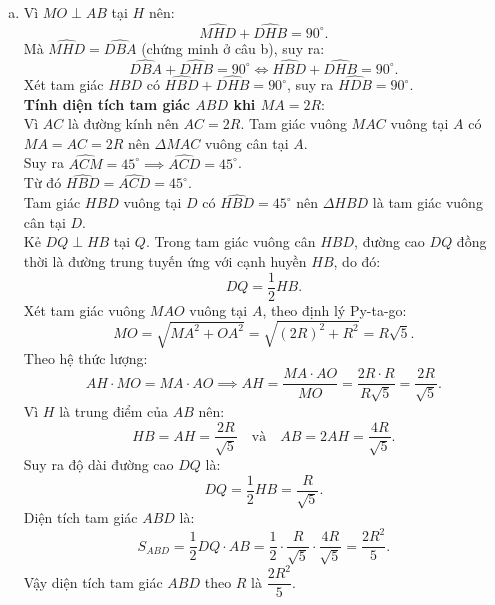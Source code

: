 \begin{bt}
{\begin{enumerate}[a)]
		Suy ra $\Delta MHD \backsim \Delta MCO$ (c-g-c), do đó:
		$$\widehat{MHD} = \widehat{MCO} = \widehat{ACD}.$$
		Mặt khác, trong đường tròn $(O)$, ta có $\widehat{ACD} = \widehat{ABD}$ (hai góc nội tiếp cùng chắn cung $AD$).\\
		Suy ra $\widehat{MHD} = \widehat{ABD} = \widehat{DBA}$.
		\item Vì $MO \perp AB$ tại $H$ nên:
		$$\widehat{MHD} + \widehat{DHB} = 90^\circ.$$
		Mà $\widehat{MHD} = \widehat{DBA}$ (chứng minh ở câu b), suy ra:
		$$\widehat{DBA} + \widehat{DHB} = 90^\circ \iff \widehat{HBD} + \widehat{DHB} = 90^\circ.$$
		Xét tam giác $HBD$ có $\widehat{HBD} + \widehat{DHB} = 90^\circ$, suy ra $\widehat{HDB} = 90^\circ$.\\
		\textbf{Tính diện tích tam giác $ABD$ khi $MA = 2R$}:\\
		Vì $AC$ là đường kính nên $AC = 2R$. Tam giác vuông $MAC$ vuông tại $A$ có $MA = AC = 2R$ nên $\Delta MAC$ vuông cân tại $A$.\\
		Suy ra $\widehat{ACM} = 45^\circ \implies \widehat{ACD} = 45^\circ$.\\
		Từ đó $\widehat{HBD} = \widehat{ACD} = 45^\circ$.\\
		Tam giác $HBD$ vuông tại $D$ có $\widehat{HBD} = 45^\circ$ nên $\Delta HBD$ là tam giác vuông cân tại $D$.\\
		Kẻ $DQ \perp HB$ tại $Q$. Trong tam giác vuông cân $HBD$, đường cao $DQ$ đồng thời là đường trung tuyến ứng với cạnh huyền $HB$, do đó:
		$$DQ = \frac{1}{2}HB.$$
		Xét tam giác vuông $MAO$ vuông tại $A$, theo định lý Py-ta-go:
		$$MO = \sqrt{MA^2 + OA^2} = \sqrt{(2R)^2 + R^2} = R\sqrt{5}.$$
		Theo hệ thức lượng:
		$$AH \cdot MO = MA \cdot AO \implies AH = \frac{MA \cdot AO}{MO} = \frac{2R \cdot R}{R\sqrt{5}} = \frac{2R}{\sqrt{5}}.$$
		Vì $H$ là trung điểm của $AB$ nên:
		$$HB = AH = \frac{2R}{\sqrt{5}} \quad \text{và} \quad AB = 2AH = \frac{4R}{\sqrt{5}}.$$
		Suy ra độ dài đường cao $DQ$ là:
		$$DQ = \frac{1}{2}HB = \frac{R}{\sqrt{5}}.$$
		Diện tích tam giác $ABD$ là:
		$$S_{ABD} = \frac{1}{2} DQ \cdot AB = \frac{1}{2} \cdot \frac{R}{\sqrt{5}} \cdot \frac{4R}{\sqrt{5}} = \frac{2R^2}{5}.$$
		Vậy diện tích tam giác $ABD$ theo $R$ là $\dfrac{2R^2}{5}$.
	\end{enumerate}
}
\end{bt}


